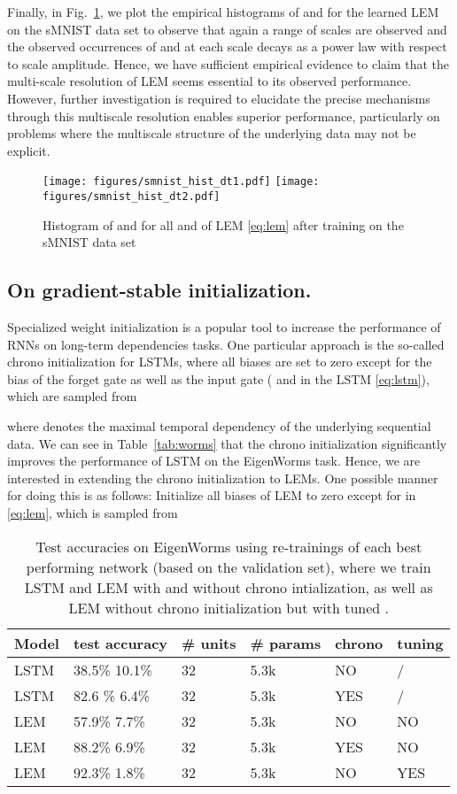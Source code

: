 \documentclass{article} \usepackage{iclr2022_conference,times}
\newcommand{\fref}[1] {Fig.~\ref{#1}}
\newcommand{\Tref}[1]{Table~\ref{#1}}
\begin{document}
Finally, in \fref{fig:hist1}, we plot the empirical histograms of  and  for the learned LEM on the sMNIST data set to observe that again a range of scales are observed and the observed occurrences of  and  at each scale decays as a power law with respect to scale amplitude. Hence, we have sufficient empirical evidence to claim that the multi-scale resolution of LEM seems essential to its observed performance. However, further investigation is required to elucidate the precise mechanisms through this multiscale resolution enables superior performance, particularly on problems where the multiscale structure of the underlying data may not be explicit. 
\begin{figure}[ht!]
\centering
\texttt{[image: figures/smnist\_hist\_dt1.pdf]}
\texttt{[image: figures/smnist\_hist\_dt2.pdf]}
\caption{Histogram of  and  for all  and  of LEM \eqref{eq:lem} after training on the sMNIST data set}
\label{fig:hist1}
\end{figure}
\subsection{On gradient-stable initialization.}
\label{sec:chrono}
Specialized weight initialization is a popular tool to increase the performance of RNNs on long-term dependencies tasks. One particular approach is the so-called chrono initialization \citep{warp} for LSTMs, where all biases are set to zero except for the bias of the forget gate as well as the input gate ( and  in the LSTM \eqref{eq:lstm}), which are sampled from

where  denotes the maximal temporal dependency of the underlying sequential data.
We can see in \Tref{tab:worms} that the chrono initialization significantly improves the performance of LSTM on the EigenWorms task. Hence, we are interested in extending the chrono initialization to LEMs. One possible manner for doing this is as follows: Initialize all biases of LEM to zero except for  in \eqref{eq:lem}, which is sampled from



\begin{table}[h!]
\caption{Test accuracies on EigenWorms using  re-trainings of each best performing network (based on the validation set), where we train LSTM and LEM with and without chrono intialization, as well as LEM without chrono initialization but with tuned .}
\label{tab:worms_chrono}
\centering
\begin{tabular}{llllll}
\toprule
\cmidrule(r){1-6}
Model &  test accuracy & \# units & \# params & chrono & tuning \\
\midrule
LSTM & 38.5\%  10.1\% & 32 & 5.3k & NO & / \\
LSTM & 82.6 \%  6.4\% & 32 & 5.3k & YES & / \\
LEM & 57.9\%  7.7\% & 32 & 5.3k & NO & NO \\
LEM & 88.2\%  6.9\% & 32 & 5.3k & YES & NO \\
LEM & 92.3\%  1.8\% & 32 & 5.3k & NO & YES \\
    \bottomrule
  \end{tabular}
\end{table}
\end{document}
